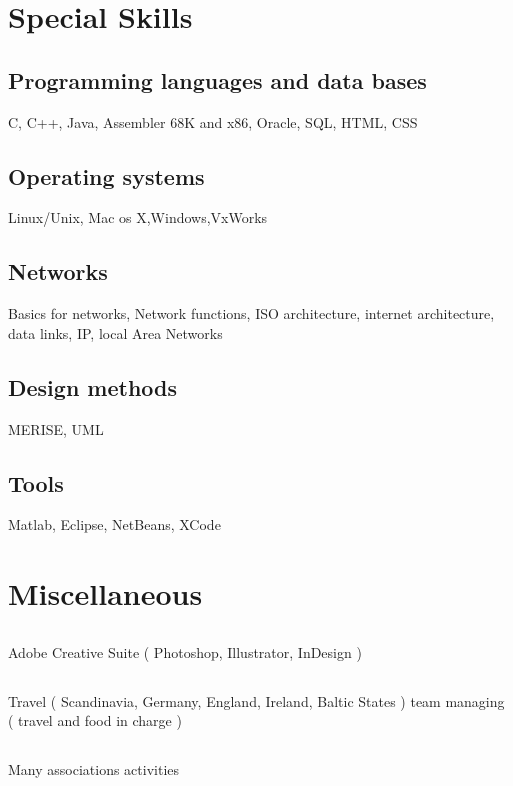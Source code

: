 \section{Special Skills}
\subsection{Programming languages and data bases}
			{C, C++, Java, Assembler 68K and x86, Oracle, SQL, HTML, CSS}
	
\subsection{Operating systems}
			{Linux/Unix, Mac os X,Windows,VxWorks}
	
\subsection{Networks}
			{Basics for networks, Network functions, ISO architecture, internet architecture, data links, IP, local Area Networks}
	
\subsection{Design methods}
			{MERISE, UML}
	
\subsection{Tools}
			{Matlab, Eclipse, NetBeans, XCode}
			
\section{Miscellaneous}
\subsection{}{Adobe Creative Suite ( Photoshop, Illustrator, InDesign )}
	
\subsection{}{Travel ( Scandinavia, Germany, England, Ireland, Baltic States ) team managing ( travel and food in charge )}
	
\subsection{}{Many associations activities}

